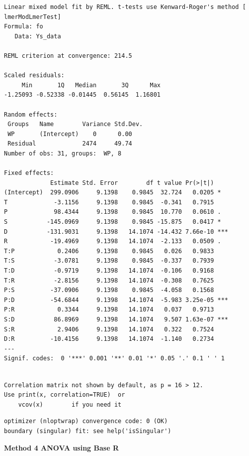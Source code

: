 \documentclass[
  letterpaper,
  DIV=11,
  numbers=noendperiod]{scrartcl}
\begin{document}
\begin{verbatim}
Linear mixed model fit by REML. t-tests use Kenward-Roger's method [
lmerModLmerTest]
Formula: fo
   Data: Ys_data

REML criterion at convergence: 214.5

Scaled residuals: 
     Min       1Q   Median       3Q      Max 
-1.25093 -0.52338 -0.01445  0.56145  1.16801 

Random effects:
 Groups   Name        Variance Std.Dev.
 WP       (Intercept)    0      0.00   
 Residual             2474     49.74   
Number of obs: 31, groups:  WP, 8

Fixed effects:
             Estimate Std. Error        df t value Pr(>|t|)    
(Intercept)  299.0906     9.1398    0.9845  32.724   0.0205 *  
T             -3.1156     9.1398    0.9845  -0.341   0.7915    
P             98.4344     9.1398    0.9845  10.770   0.0610 .  
S           -145.0969     9.1398    0.9845 -15.875   0.0417 *  
D           -131.9031     9.1398   14.1074 -14.432 7.66e-10 ***
R            -19.4969     9.1398   14.1074  -2.133   0.0509 .  
T:P            0.2406     9.1398    0.9845   0.026   0.9833    
T:S           -3.0781     9.1398    0.9845  -0.337   0.7939    
T:D           -0.9719     9.1398   14.1074  -0.106   0.9168    
T:R           -2.8156     9.1398   14.1074  -0.308   0.7625    
P:S          -37.0906     9.1398    0.9845  -4.058   0.1568    
P:D          -54.6844     9.1398   14.1074  -5.983 3.25e-05 ***
P:R            0.3344     9.1398   14.1074   0.037   0.9713    
S:D           86.8969     9.1398   14.1074   9.507 1.63e-07 ***
S:R            2.9406     9.1398   14.1074   0.322   0.7524    
D:R          -10.4156     9.1398   14.1074  -1.140   0.2734    
---
Signif. codes:  0 '***' 0.001 '**' 0.01 '*' 0.05 '.' 0.1 ' ' 1
\end{verbatim}

\begin{verbatim}

Correlation matrix not shown by default, as p = 16 > 12.
Use print(x, correlation=TRUE)  or
    vcov(x)        if you need it
\end{verbatim}

\begin{verbatim}
optimizer (nloptwrap) convergence code: 0 (OK)
boundary (singular) fit: see help('isSingular')
\end{verbatim}

\textbf{Method 4 ANOVA using Base R}
\end{document}
